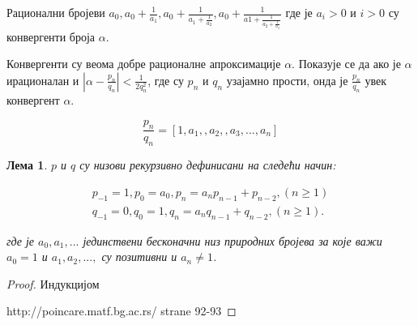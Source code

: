 \documentclass[a4paper]{article}
\newtheorem{lemma}{Лема}
\begin{document}
Рационални бројеви $ a_{0}, a_{0} + \frac{1}{a_{1}}, a_{0} + \frac{1}{a_{1} + \frac{1}{a_{2}}}, a_{0} + \frac{1}{a{1} + \frac{1}{a_{2} + \frac{1}{a_{3}}}} $ где је $ a_{i} > 0 $ и $ i > 0 $ су конвергенти броја $ \alpha $. 

Конвергенти су веома добре рационалне апроксимације $ \alpha $. Показује се да ако је $ \alpha $ ирационалан и $ |\alpha - \frac{p_{n}}{q_{n}}| < \frac{1}{2q_{n}^2} $, где су $ p_{n} $ и $ q_{n} $ узајамно прости, онда је $ \frac{p_{n}}{q_{n}} $ увек конвергент $ \alpha $.

\begin{displaymath}
\frac{p_{n}}{q_{n}} = [1, a_{1}, , a_{2}, , a_{3}, ..., a_{n}]
\end{displaymath}

\begin{lemma}
	\label{def:p_q_nizovi}
	$ p $ и $ q $ су низови рекурзивно дефинисани на следећи начин:
	
	\begin{eqnarray}
	p_{-1} = 1, p_{0} = a_{0}, p_{n} = a_{n}p_{n-1} + p_{n-2}, (n \geq 1 )\\
	q_{-1} = 0, q_{0} = 1, q_{n} = a_{n}q_{n-1} + q_{n-2}, (n \geq 1 ).
	\end{eqnarray}
	
	где је $ a_{0}, a_{1}, ... $ јединствени бесконачни низ природних бројева за које важи $ a_{0} = 1 $ и $ a_{1}, a_{2}, ... ,  $ су позитивни и $ a_{n} \ne 1 $.
\end{lemma}

\begin{proof}
	
	Индукцијом
	
	http://poincare.matf.bg.ac.rs/%
	strane 92-93
\end{proof}




\end{document}

